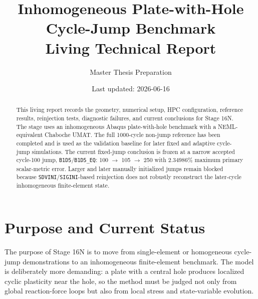 \documentclass[11pt,a4paper]{article}
\title{\stage{} Inhomogeneous Plate-with-Hole Cycle-Jump Benchmark\\Living Technical Report}
\author{Master Thesis Preparation}
\date{Last updated: 2026-06-16}
\newcommand{\code}[1]{\texttt{#1}}
\newcommand{\stage}{Stage 16N}
\begin{document}
\maketitle

\begin{abstract}
This living report records the geometry, numerical setup, HPC configuration, reference results, reinjection tests, diagnostic failures, and current conclusions for \stage{}. The stage uses an inhomogeneous Abaqus plate-with-hole benchmark with a NEML-equivalent Chaboche UMAT. The full 1000-cycle non-jump reference has been completed and is used as the validation baseline for later fixed and adaptive cycle-jump simulations. The current fixed-jump conclusion is frozen at a narrow accepted cycle-100 jump, \code{B1D5}/\code{B1D5\_EQ}: 100 $\rightarrow$ 105 $\rightarrow$ 250 with 2.34986\% maximum primary scalar-metric error. Larger and later manually initialized jumps remain blocked because \code{SDVINI}/\code{SIGINI}-based reinjection does not robustly reconstruct the later-cycle inhomogeneous finite-element state.
\end{abstract}

\tableofcontents
\newpage

\section{Purpose and Current Status}

The purpose of \stage{} is to move from single-element or homogeneous cycle-jump demonstrations to an inhomogeneous finite-element benchmark. The model is deliberately more demanding: a plate with a central hole produces localized cyclic plasticity near the hole, so the method must be judged not only from global reaction-force loops but also from local stress and state-variable evolution.
\end{document}
